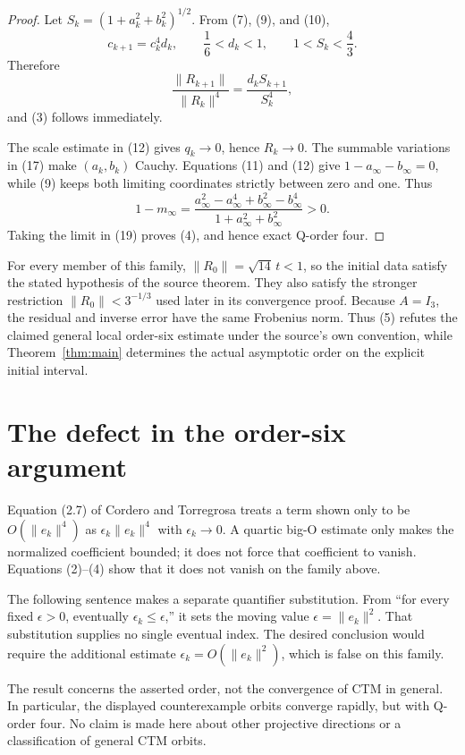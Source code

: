 \documentclass[11pt]{article}
\newcommand{\norm}[1]{\lVert #1\rVert}
\begin{document}
\begin{proof}
Let $S_k=(1+a_k^2+b_k^2)^{1/2}$.  From (7), (9), and (10),
\begin{equation}
 c_{k+1}=c_k^4d_k,\qquad \frac16<d_k<1,\qquad
 1<S_k<\frac43.
\end{equation}
Therefore
\[
 \frac{\norm{R_{k+1}}}{\norm{R_k}^4}
 =\frac{d_kS_{k+1}}{S_k^4},
\]
and (3) follows immediately.

The scale estimate in (12) gives $q_k\to0$, hence $R_k\to0$.  The summable
variations in (17) make $(a_k,b_k)$ Cauchy.  Equations (11) and (12) give
$1-a_\infty-b_\infty=0$, while (9) keeps both limiting coordinates strictly
between zero and one.  Thus
\[
 1-m_\infty
 =\frac{a_\infty^2-a_\infty^4+b_\infty^2-b_\infty^4}
        {1+a_\infty^2+b_\infty^2}>0.
\]
Taking the limit in (19) proves (4), and hence exact Q-order four.
\end{proof}

For every member of this family,
$\norm{R_0}=\sqrt{14}\,t<1$, so the initial data satisfy the stated hypothesis
of the source theorem.  They also satisfy the stronger restriction
$\norm{R_0}<3^{-1/3}$ used later in its convergence proof.  Because $A=I_3$,
the residual and inverse error have the same Frobenius norm.  Thus (5) refutes
the claimed general local order-six estimate under the source's own
convention, while Theorem~\ref{thm:main} determines the actual asymptotic
order on the explicit initial interval.

\section{The defect in the order-six argument}

Equation (2.7) of Cordero and Torregrosa \cite{CorderoTorregrosa2026} treats a
term shown only to be $O(\norm{e_k}^4)$ as
$\epsilon_k\norm{e_k}^4$ with $\epsilon_k\to0$.  A quartic big-O estimate
only makes the normalized coefficient bounded; it does not force that
coefficient to vanish.  Equations (2)--(4) show that it does not vanish on the
family above.

The following sentence makes a separate quantifier substitution.  From
``for every fixed $\epsilon>0$, eventually $\epsilon_k\leq\epsilon$,'' it sets
the moving value $\epsilon=\norm{e_k}^2$.  That substitution supplies no
single eventual index.  The desired conclusion would require the additional
estimate $\epsilon_k=O(\norm{e_k}^2)$, which is false on this family.

The result concerns the asserted order, not the convergence of CTM in general.
In particular, the displayed counterexample orbits converge rapidly, but with
Q-order four.  No claim is made here about other projective directions or a
classification of general CTM orbits.
\end{document}
